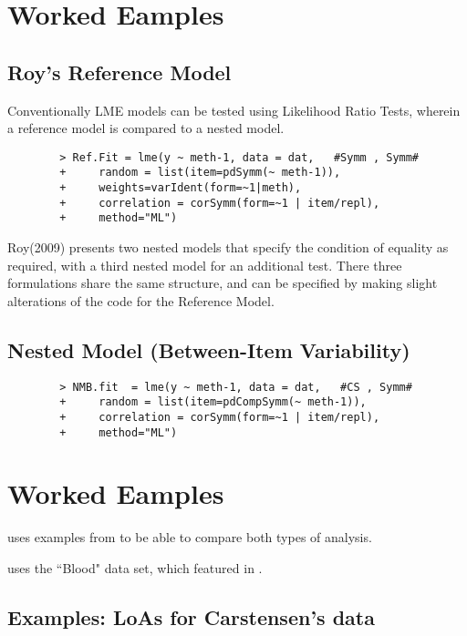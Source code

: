 \documentclass[12pt, a4paper]{report}
\theoremstyle{plain}
\theoremstyle{definition}
\theoremstyle{remark}
\begin{document}
	\section{Worked Eamples}
	\newpage
	\subsection{Roy's Reference Model}
	Conventionally LME models can be tested using Likelihood Ratio Tests, wherein a reference model is compared to a nested model.
	\begin{framed}
		\begin{verbatim}
		> Ref.Fit = lme(y ~ meth-1, data = dat,   #Symm , Symm#
		+     random = list(item=pdSymm(~ meth-1)), 
		+     weights=varIdent(form=~1|meth),
		+     correlation = corSymm(form=~1 | item/repl), 
		+     method="ML")
		\end{verbatim}
	\end{framed}
	
	
	Roy(2009) presents two nested models that specify the condition of equality as required, with a third nested model for an additional test. There three formulations share the same structure, and can be specified by making slight alterations of the code for the Reference Model.
	
	\subsection{Nested Model (Between-Item Variability)}
	\begin{framed}
		\begin{verbatim}
		> NMB.fit  = lme(y ~ meth-1, data = dat,   #CS , Symm#
		+     random = list(item=pdCompSymm(~ meth-1)),
		+     correlation = corSymm(form=~1 | item/repl), 
		+     method="ML")
		\end{verbatim}
	\end{framed}
	
	\newpage
	\section{Worked Eamples}
	
	\citet{ARoy2009} uses examples from \citet{BA86} to be able to
	compare both types of analysis.
	
	\citet{Roy2006} uses the ``Blood" data set, which featured in \citet{BA99}.
	

	\subsection{Examples: LoAs for Carstensen's data}
	
\end{document}
